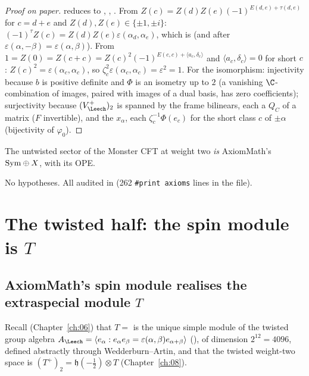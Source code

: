 \begin{proof}[Proof on paper]
 reduces to , , .  From
$Z(c)=Z(d)Z(e)(-1)^{E(d,e)+\tau(d,e)}$ for $c=d+e$ and $Z(d),Z(e)\in\{\pm1,\pm i\}$:
$(-1)^{\tau}Z(c)=Z(d)Z(e)\varepsilon(\alpha_d,\alpha_e)$, which is  (and 
after $\varepsilon(\alpha,-\beta)=\varepsilon(\alpha,\beta)$).  From $1=Z(0)=Z(c+c)=Z(c)^2(-1)^{E(c,c)+\langle a_c,\delta_c\rangle}$ and
$\langle a_c,\delta_c\rangle=0$ for short $c$: $Z(c)^2=\varepsilon(\alpha_c,\alpha_c)$, so
$\zeta_c^2\varepsilon(\alpha_c,\alpha_c)=\varepsilon^2=1$.  For the isomorphism: injectivity because $b$ is
positive definite and $\Phi$ is an isometry up to $2$ (a vanishing $\C$-combination of images, paired
with images of a dual basis, has zero coefficients); surjectivity because $(V_\Leech^+)_2$ is spanned
by the frame bilinears, each a $Q_C$ of a matrix ($F$ invertible), and the $x_\alpha$, each
$\zeta_c^{-1}\Phi(e_c)$ for the short class $c$ of $\pm\alpha$ (bijectivity of $\varphi_0$).
\end{proof}
\begin{physics}
The untwisted sector of the Monster CFT at weight two \emph{is} AxiomMath's $\mathrm{Sym}\oplus X$, with its
OPE.
\end{physics}
\begin{status}
No hypotheses.  All audited in  (262 \texttt{\#print axioms}
lines in the file).
\end{status}

\section{The twisted half: the spin module is \texorpdfstring{$T$}{T}}\label{ch21:sec:twisted}

\subsection{AxiomMath's spin module realises the extraspecial module \texorpdfstring{$T$}{T}}

Recall (Chapter~\ref{ch:06}) that $T=$  is the unique simple module of the twisted
group algebra $A_\Leech=\langle e_\alpha: e_\alpha e_\beta=\varepsilon(\alpha,\beta)e_{\alpha+\beta}\rangle$
(), of dimension $2^{12}=4096$, defined abstractly through Wedderburn--Artin,
and that the twisted weight-two space is $(T^+)_2=\mathfrak h(-\tfrac12)\otimes T$ (Chapter~\ref{ch:08}).

